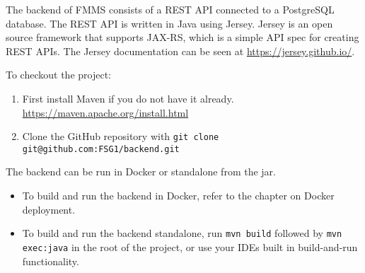 \documentclass{report}
\begin{document}
	The backend of FMMS consists of a REST API connected to a PostgreSQL database. The REST API is written in Java using Jersey. Jersey is an open source framework that supports JAX-RS, which is a simple API spec for creating REST APIs. The Jersey documentation can be seen at \url{https://jersey.github.io/}.
	
	To checkout the project:
	\begin{enumerate}
		\item First install Maven if you do not have it already. \\ 
		\url{https://maven.apache.org/install.html}
		\item Clone the GitHub repository with \texttt{git clone git@github.com:FSG1/backend.git}
	\end{enumerate}
	
	The backend can be run in Docker or standalone from the jar.
	\begin{itemize}
		\item To build and run the backend in Docker, refer to the chapter on Docker deployment.
		\item To build and run the backend standalone, run \texttt{mvn build} followed by \texttt{mvn exec:java} in the root of the project, or use your IDEs built in build-and-run functionality.	
	\end{itemize}
\end{document}
